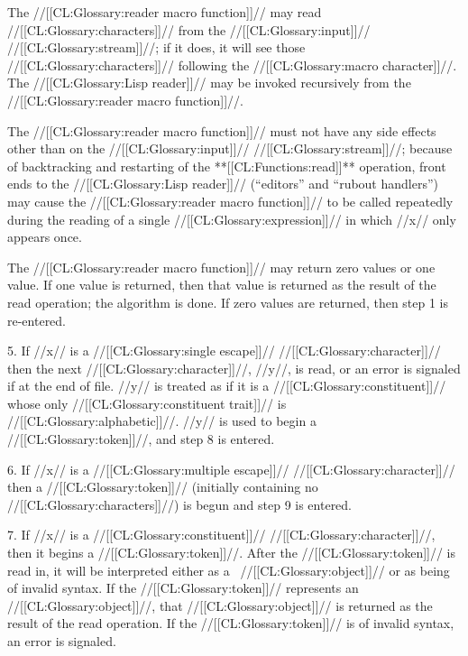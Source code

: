The //[[CL:Glossary:reader macro function]]// may read //[[CL:Glossary:characters]]//  from the //[[CL:Glossary:input]]// //[[CL:Glossary:stream]]//;  if it does, it will see those //[[CL:Glossary:characters]]// following the //[[CL:Glossary:macro character]]//. The //[[CL:Glossary:Lisp reader]]// may be invoked recursively from the //[[CL:Glossary:reader macro function]]//.

The //[[CL:Glossary:reader macro function]]// must not have any side effects other than on the //[[CL:Glossary:input]]// //[[CL:Glossary:stream]]//; because of backtracking and restarting of the **[[CL:Functions:read]]** operation, front ends to the //[[CL:Glossary:Lisp reader]]// (\eg ``editors'' and ``rubout handlers'')  may cause the //[[CL:Glossary:reader macro function]]// to be called repeatedly during the reading of a single //[[CL:Glossary:expression]]// in which //x// only appears once.

The //[[CL:Glossary:reader macro function]]// may return zero values or one value. If one value is returned, then that value is returned as the result of the read operation; the algorithm is done. If zero values are returned, then step 1 is re-entered.

\item{5.} If //x// is a //[[CL:Glossary:single escape]]// //[[CL:Glossary:character]]// then the next //[[CL:Glossary:character]]//, //y//, is read, or an error   is signaled if at the end of file. //y// is treated as if it is a //[[CL:Glossary:constituent]]//  whose only //[[CL:Glossary:constituent trait]]// is //[[CL:Glossary:alphabetic]]//. //y// is used to begin a //[[CL:Glossary:token]]//, and step 8 is entered.

\item{6.} If //x// is a //[[CL:Glossary:multiple escape]]// //[[CL:Glossary:character]]// then a //[[CL:Glossary:token]]// (initially containing no //[[CL:Glossary:characters]]//) is  begun and step 9 is entered.

\item{7.} If //x// is a //[[CL:Glossary:constituent]]// //[[CL:Glossary:character]]//, then it begins a //[[CL:Glossary:token]]//. After the //[[CL:Glossary:token]]// is read in, it will be interpreted either as a \Lisp\ //[[CL:Glossary:object]]// or as being of invalid syntax. If the //[[CL:Glossary:token]]// represents an //[[CL:Glossary:object]]//, that //[[CL:Glossary:object]]// is returned as the result of the read operation. If the //[[CL:Glossary:token]]// is of invalid syntax, an error is signaled.

